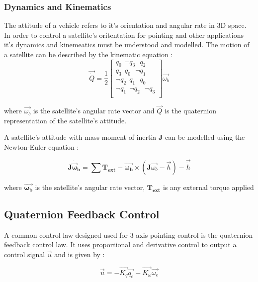 \subsubsection{Dynamics and Kinematics}
The attitude of a vehicle refers to it's orientation and angular rate in 3D space. In order to control a satellite's oritentation for pointing and other applications it's dynamics and kinemeatics must be understood and modelled. The motion of a satellite can be described by the kinematic equation \cite{sidiAttitudeDynamicsKinematics1997}:
\begin{equation}
    \vec{\dot{Q}}
=\frac{1}{2}
\begin{bmatrix}
q_{0} \ \ \neg q_{3} \ \ \ q_{2} \\ 
q_{3} \ \ q_{0} \ \ \ \neg q_{1} \\ 
\neg q_{2} \ \ q_{1} \ \ \ q_{0} \\ 
\neg q_{1} \ \ \neg q_{2} \ \ \ \neg q_{3} \\
\end{bmatrix} \vec{\omega_{b}}
\end{equation}

where $\vec{\omega_{b}}$ is the satellite's angular rate vector and $\vec{Q}$ is the quaternion representation of the satellite's attitude. 

A satellite's attitude with mass moment of inertia $\boldsymbol{J}$ can be modelled using the Newton-Euler equation \cite{sidiAttitudeDynamicsKinematics1997}: 

\begin{equation}
\mathbf{J}\mathbf{\dot{\vec{\omega}}_b} = \sum{\mathbf{T_{ext}}} -\mathbf{\vec{\omega_{b}}}\times(\mathbf{J}\vec{\omega_{b}}-\vec{h})-\vec{\dot{h}}
\end{equation}

where $\boldsymbol{\vec{\omega_{b}}}$ is the satellite's angular rate vector, $\boldsymbol{T_{ext}}$ is any external torque applied

\subsection{Quaternion Feedback Control}
A common control law designed used for 3-axis pointing control is the quaternion feedback control law. It uses proportional and derivative control to output a control signal $\vec{u}$ and is given by \cite{wieSpaceVehicleDynamics1998}:

\begin{equation}
    \vec{u} = -\vec{K_{q}}\vec{q_{e}} - \vec{K_{\omega}}\vec{\omega_{e}}
\end{equation}


